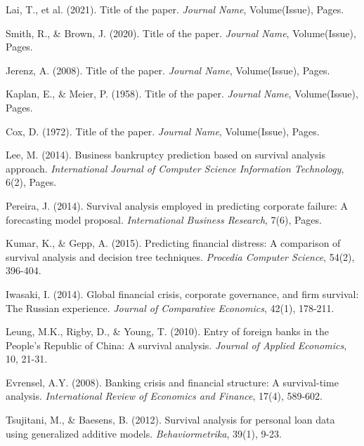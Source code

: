 \documentclass[doublespacing,12pt]{report}
\begin{document}
{\begin{enumerate}[label=\textbf{[\arabic*]}]
\item Lai, T., et al. (2021). Title of the paper. \textit{Journal Name}, Volume(Issue), Pages.

\item Smith, R., \& Brown, J. (2020). Title of the paper. \textit{Journal Name}, Volume(Issue), Pages.

\item Jerenz, A. (2008). Title of the paper. \textit{Journal Name}, Volume(Issue), Pages.

\item Kaplan, E., \& Meier, P. (1958). Title of the paper. \textit{Journal Name}, Volume(Issue), Pages.

\item Cox, D. (1972). Title of the paper. \textit{Journal Name}, Volume(Issue), Pages.

\item Lee, M. (2014). Business bankruptcy prediction based on survival analysis approach. \textit{International Journal of Computer Science Information Technology}, 6(2), Pages.

\item Pereira, J. (2014). Survival analysis employed in predicting corporate failure: A forecasting model proposal. \textit{International Business Research}, 7(6), Pages.

\item Kumar, K., \& Gepp, A. (2015). Predicting financial distress: A comparison of survival analysis and decision tree techniques. \textit{Procedia Computer Science}, 54(2), 396-404.

\item Iwasaki, I. (2014). Global financial crisis, corporate governance, and firm survival: The Russian experience. \textit{Journal of Comparative Economics}, 42(1), 178-211.

\item Leung, M.K., Rigby, D., \& Young, T. (2010). Entry of foreign banks in the People's Republic of China: A survival analysis. \textit{Journal of Applied Economics}, 10, 21-31.

\item Evrensel, A.Y. (2008). Banking crisis and financial structure: A survival-time analysis. \textit{International Review of Economics and Finance}, 17(4), 589-602.

\item Tsujitani, M., \& Baesens, B. (2012). Survival analysis for personal loan data using generalized additive models. \textit{Behaviormetrika}, 39(1), 9-23.


\end{enumerate}}
\end{document}
